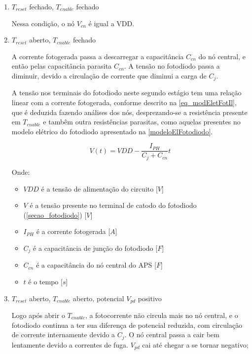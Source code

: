\begin{enumerate}

\item \emph{$T_{reset}$} fechado, \emph{$T_{enable}$} fechado
    
Nessa condição, o n\'o $V_{cn}$ \'e igual a VDD.

\item \emph{$T_{reset}$} aberto, \emph{$T_{enable}$} fechado

A corrente fotogerada passa a descarregar a capacit\^ancia $C_{cn}$ do nó central, e então pelas capacitância parasita \emph{$C_{cn}$}. A tensão no fotodiodo passa a diminuir, devido a circulação de corrente que diminui a carga de \emph{$C_{j}$}.

A tens\~ao nos terminais do fotodiodo neste segundo est\'agio tem uma rela{\c c}\~ao linear com a corrente fotogerada, conforme descrito na \autoref{eq_modEletFotIl}, que \'e deduzida fazendo an\'alises dos n\'os, desprezando-se a resistência presente em $T_{enable}$ e tamb\^em outra resistências parasitas, como aquelas presentes no modelo elétrico do fotodiodo apresentado na \autoref{modeloElFotodiodo}.

\begin{equation}
    \label{eq_modEletFotIl}
    V(t) = VDD-\frac{I_{PH}}{C_j+C_{cn}}t
\end{equation}

Onde:

\begin{itemize}
    \item $VDD$ \'e a tens\~ao de alimenta{\c c}\~ao do circuito [$V$]
    \item $V$ \'e a tens\~ao presente no terminal de catodo do fotodiodo (\autoref{secao_fotodiodo}) [$V$]
    \item $I_{PH}$ \'e a corrente fotogerada [$A$]
    \item $C_j$ \'e a capacit\^ancia de jun{\c c}\~ao do fotodiodo [$F$]
    \item $C_{cn}$ \'e a capacit\^ancia do n\'o central do APS [$F$]
    \item $t$ \'e o tempo [$s$]
\end{itemize}

\item \emph{$T_{reset}$} aberto, \emph{$T_{enable}$} aberto, potencial \emph{$V_{pd}$} positivo

Logo ap\'os abrir o $T_{enable}$, a fotocorrente n\~ao circula mais no n\'o central, e o fotodiodo continua a ter sua diferen{\c c}a de potencial reduzida, com circula{\c c}\~ao de corrente internamente devido a \emph{$C_j$}. O n\'o central passa a cair bem lentamente devido a correntes de fuga. \emph{$V_{pd}$} cai at\'e chegar a se tornar negativo;


\end{enumerate}

